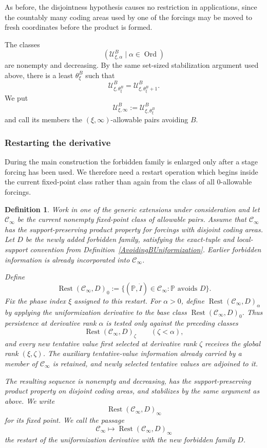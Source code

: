 \documentclass[a4paper,11pt]{article}
\newtheorem{definition}[theorem]{Definition}
\newcommand{\forceP}{\mathbb{P}}
\begin{document}
As before, the disjointness hypothesis causes no restriction in applications, since the countably many coding areas used by one of the forcings may be moved to fresh coordinates before the product is formed.

The classes
\[
(\mathcal U^B_{\xi,\alpha}\mid\alpha\in\operatorname{Ord})
\]
are nonempty and decreasing. By the same set-sized stabilization argument used above, there is a least $\theta^B_\xi$ such that
\[
\mathcal U^B_{\xi,\theta^B_\xi}
=
\mathcal U^B_{\xi,\theta^B_\xi+1}.
\]
We put
\[
\mathcal U^B_{\xi,\infty}
:=
\mathcal U^B_{\xi,\theta^B_\xi}
\]
and call its members the $(\xi,\infty)$-allowable pairs avoiding $B$.

\subsubsection{Restarting the derivative}

During the main construction the forbidden family is enlarged only after a stage forcing has been used. We therefore need a restart operation which begins inside the current fixed-point class rather than again from the class of all $0$-allowable forcings.

\begin{definition}\label{RestartUniformizationDerivative}
Work in one of the generic extensions under consideration and let $\mathcal C_\infty$ be the current nonempty fixed-point class of allowable pairs. Assume that $\mathcal C_\infty$ has the support-preserving product property for forcings with disjoint coding areas. Let $D$ be the newly added forbidden family, satisfying the exact-tuple and local-support convention from Definition~\ref{AvoidingBUniformization}. Earlier forbidden information is already incorporated into $\mathcal C_\infty$.

Define
\[
\operatorname{Rest}(\mathcal C_\infty,D)_0
:=
\{(\forceP,\dot I)\in\mathcal C_\infty:
\forceP\text{ avoids }D\}.
\]
Fix the phase index $\xi$ assigned to this restart. For $\alpha>0$, define $\operatorname{Rest}(\mathcal C_\infty,D)_\alpha$ by applying the uniformization derivative to the base class $\operatorname{Rest}(\mathcal C_\infty,D)_0$. Thus persistence at derivative rank $\alpha$ is tested only against the preceding classes
\[
\operatorname{Rest}(\mathcal C_\infty,D)_\zeta
\qquad(\zeta<\alpha),
\]
and every new tentative value first selected at derivative rank $\zeta$ receives the global rank $(\xi,\zeta)$. The auxiliary tentative-value information already carried by a member of $\mathcal C_\infty$ is retained, and newly selected tentative values are adjoined to it.

The resulting sequence is nonempty and decreasing, has the support-preserving product property on disjoint coding areas, and stabilizes by the same argument as above. We write
\[
\operatorname{Rest}(\mathcal C_\infty,D)_\infty
\]
for its fixed point. We call the passage
\[
\mathcal C_\infty\longmapsto\operatorname{Rest}(\mathcal C_\infty,D)_\infty
\]
the \emph{restart of the uniformization derivative with the new forbidden family $D$}.
\end{definition}
\end{document}
